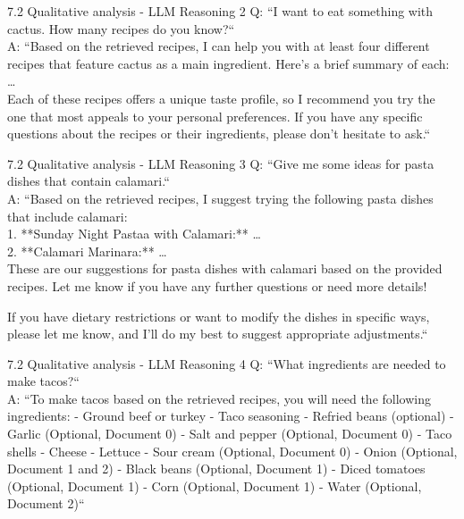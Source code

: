 \documentclass{beamer}
\begin{document}
\begin{frame}{7.2 Qualitative analysis - LLM Reasoning 2}
  Q: ``I want to eat something with cactus. How many recipes do you know?``\\
  A: ``Based on the retrieved recipes, I can help you with at least four different recipes that feature cactus as a main ingredient. Here's a brief summary of each:\\
  \ldots \\
  Each of these recipes offers a unique taste profile, so I recommend you try the one that most appeals to your personal preferences. If you have any specific questions about the recipes or their ingredients, please don't hesitate to ask.``
\end{frame}

\begin{frame}{7.2 Qualitative analysis - LLM Reasoning 3}
  Q: ``Give me some ideas for pasta dishes that contain calamari.``\\
  A: ``Based on the retrieved recipes, I suggest trying the following pasta dishes that include calamari:\\
  1. **Sunday Night Pastaa with Calamari:** \ldots\\
  2. **Calamari Marinara:** \ldots\\

  These are our suggestions for pasta dishes with calamari based on the provided recipes. Let me know if you have any further questions or need more details!

  If you have dietary restrictions or want to modify the dishes in specific ways, please let me know, and I'll do my best to suggest appropriate adjustments.``
\end{frame}

\begin{frame}{7.2 Qualitative analysis - LLM Reasoning 4}
  Q: ``What ingredients are needed to make tacos?``\\
  A: ``To make tacos based on the retrieved recipes, you will need the following ingredients:
  - Ground beef or turkey
  - Taco seasoning
  - Refried beans (optional)
  - Garlic (Optional, Document 0)
  - Salt and pepper (Optional, Document 0)
  - Taco shells
  - Cheese
  - Lettuce
  - Sour cream (Optional, Document 0)
  - Onion (Optional, Document 1 and 2)
  - Black beans (Optional, Document 1)
  - Diced tomatoes (Optional, Document 1)
  - Corn (Optional, Document 1)
  - Water (Optional, Document 2)``
\end{frame}
\end{document}
